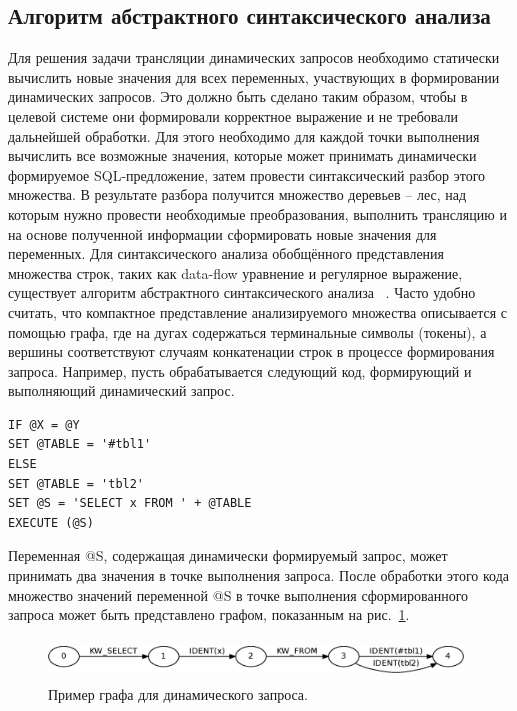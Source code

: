 \documentclass{llncs}
\begin{document}
\subsection{Алгоритм абстрактного синтаксического анализа}

Для решения задачи трансляции динамических запросов необходимо статически вычислить новые значения для всех переменных, участвующих в формировании динамических запросов. Это должно быть сделано  таким образом, чтобы в целевой системе они формировали корректное выражение и не требовали дальнейшей обработки. Для этого необходимо для каждой точки выполнения вычислить все возможные значения, которые может принимать динамически формируемое SQL-предложение, затем провести синтаксический разбор этого множества. В результате разбора получится множество деревьев -- лес, над которым нужно провести необходимые преобразования, выполнить трансляцию и на основе полученной информации сформировать новые значения для переменных.
	Для синтаксического анализа обобщённого представления множества строк, таких как data-flow уравнение и регулярное выражение, существует алгоритм абстрактного синтаксического анализа ~\cite{AbstrParsing}. Часто удобно считать, что компактное представление анализируемого множества описывается с помощью графа, где на дугах содержаться терминальные символы (токены), а вершины соответствуют случаям конкатенации строк в процессе формирования запроса. Например, пусть обрабатывается следующий код, формирующий и выполняющий динамический запрос.
\begin{verbatim}
IF @X = @Y
SET @TABLE = '#tbl1'
ELSE
SET @TABLE = 'tbl2'
SET @S = 'SELECT x FROM ' + @TABLE
EXECUTE (@S)
\end{verbatim}
Переменная @S, содержащая динамически формируемый запрос, может принимать два значения в точке выполнения запроса. После обработки этого кода  множество значений переменной @S в точке выполнения сформированного запроса может быть представлено графом, показанным на рис.~\ref{pic1}.

\begin{figure}
    \begin{center}
        \includegraphics[width=11cm,height=1.1cm]{graphs/simple_sql.eps}
        \caption{Пример графа для динамического запроса.}
        \label{pic1}        
    \end{center}
\end{figure}
\end{document}
